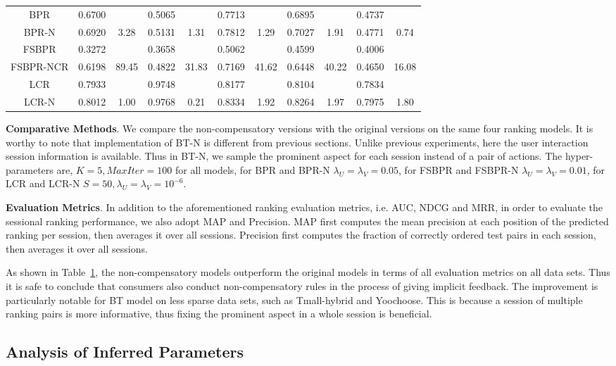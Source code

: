 \documentclass[letterpaper]{article} %
\begin{document}
\begin{table}[ht]
{\begin{tabular}{c cc |cc |cc|cc|cc}
BPR&	0.6700	&&	0.5065	&&	0.7713&&		0.6895	&&	0.4737&\\	
BPR-N	&0.6920	&3.28&	0.5131	&1.31&	0.7812&	1.29&	0.7027	&1.91&	0.4771	&0.74\\
FSBPR	&0.3272 	&&	0.3658 	&&	0.5062 	&&	0.4599 	&&	0.4006 	&\\
FSBPR-NCR	&0.6198 &	89.45&	0.4822 &	31.83&	0.7169& 	41.62&	0.6448 &	40.22&	0.4650 &	16.08\\
LCR &0.7933& &0.9748 && 0.8177& &0.8104& & 0.7834 &\\ 
LCR-N &0.8012 &1.00 & 0.9768 &0.21 &0.8334 &1.92 &0.8264 & 1.97 &0.7975  &1.80\\
	\hline
	\end{tabular}}
\label{tab:gradedresult}
\end{table}%

\textbf{Comparative Methods}. We compare the non-compensatory versions with the original versions on the same four ranking models. It is worthy to note that implementation of BT-N is different from previous sections. Unlike previous experiments, here the user interaction session information is available. Thus in BT-N, we sample the prominent aspect for each session instead of a pair of actions. The hyper-parameters are, $K=5, MaxIter=100$ for all models, for BPR and BPR-N $\lambda_U=\lambda_V=0.05$, for FSBPR and FSBPR-N $\lambda_U=\lambda_V=0.01$, for LCR and LCR-N $S=50,\lambda_U=\lambda_V=10^{-6}$.  

\textbf{Evaluation Metrics}.  In addition to the aforementioned  ranking evaluation metrics, i.e. AUC, NDCG and MRR, in order to evaluate the sessional ranking performance, we also adopt  MAP and Precision. MAP first computes the mean precision at each position of the predicted ranking per session, then averages it over all sessions. Precision first computes the fraction of correctly ordered test pairs in each session, then averages it over all sessions. 

As shown in Table~\ref{tab:gradedresult}, the non-compensatory models outperform the original models in terms of all evaluation metrics on all data sets. Thus it is safe to conclude that consumers also conduct non-compensatory rules in the process of giving implicit feedback. The improvement is particularly notable for BT model on less sparse data sets, such as Tmall-hybrid and Yoochoose. This is because a session of multiple ranking pairs is more informative, thus fixing the prominent aspect in a whole session is beneficial.

\subsection{Analysis of Inferred Parameters}
\end{document}
